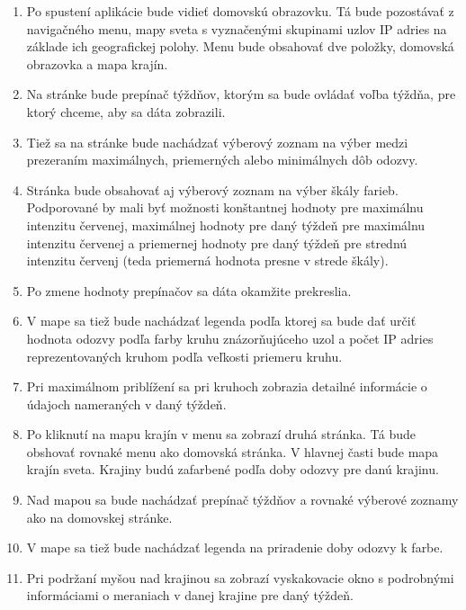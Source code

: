 \begin{enumerate}
    \item Po spustení aplikácie bude vidieť domovskú obrazovku. Tá bude pozostávať z navigačného menu, mapy sveta s vyznačenými skupinami 
    uzlov IP adries na základe ich geografickej polohy. Menu bude obsahovať dve položky, domovská obrazovka a mapa krajín.
    \item  Na stránke bude prepínač týždňov, 
    ktorým sa bude ovládať voľba týždňa, pre ktorý chceme, aby sa dáta zobrazili.
    \item Tiež sa na stránke bude nachádzať výberový zoznam na výber medzi prezeraním 
    maximálnych, priemerných alebo minimálnych dôb odozvy.
    \item Stránka bude obsahovať aj výberový zoznam na výber škály farieb. Podporované by mali byť možnosti konštantnej hodnoty pre maximálnu intenzitu červenej,
    maximálnej hodnoty pre daný týždeň pre maximálnu intenzitu červenej a priemernej hodnoty pre daný týždeň pre strednú intenzitu červenj (teda priemerná 
    hodnota presne v strede škály).
    \item Po zmene hodnoty prepínačov sa dáta okamžite prekreslia.
    \item V mape sa tiež bude nachádzať legenda podľa ktorej sa bude dať určiť hodnota odozvy podľa farby kruhu znázorňujúceho uzol a počet IP adries reprezentovaných 
    kruhom podľa veľkosti priemeru kruhu.
    \item Pri maximálnom priblížení sa pri kruhoch zobrazia detailné informácie o údajoch nameraných v daný týždeň.
    \item Po kliknutí na mapu krajín v menu sa zobrazí druhá stránka. Tá bude obshovať rovnaké menu ako domovská stránka. V hlavnej časti bude mapa krajín sveta. 
    Krajiny budú zafarbené podľa doby odozvy pre danú krajinu.
    \item Nad mapou sa bude nachádzať prepínač týždňov a rovnaké výberové zoznamy ako na domovskej stránke.
    \item V mape sa tiež bude nachádzať legenda na priradenie doby odozvy k farbe.
    \item Pri podržaní myšou nad krajinou sa zobrazí vyskakovacie okno s podrobnými informáciami o meraniach v danej krajine pre daný týždeň.
\end{enumerate}

